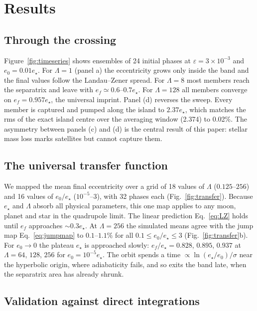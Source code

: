 \documentclass[11pt,a4paper]{article}
\newcommand{\estar}{e_\star}
\newcommand{\eps}{\varepsilon}
\begin{document}
\section{Results}\label{sec:results}

\subsection{Through the crossing}

Figure~\ref{fig:timeseries} shows ensembles of 24 initial phases at $\eps=3\times10^{-3}$ and $e_0=0.01\estar$. For $\Lambda=1$ (panel a) the eccentricity grows only inside the band and the final values follow the Landau--Zener spread. For $\Lambda=8$ most members reach the separatrix and leave with $e_f\simeq0.6$--$0.7\estar$. For $\Lambda=128$ all members converge on $e_f=0.957\estar$, the universal imprint. Panel (d) reverses the sweep. Every member is captured and pumped along the island to $2.37\estar$, which matches the rms of the exact island centre over the averaging window (2.374) to 0.02\%. The asymmetry between panels (c) and (d) is the central result of this paper: stellar mass loss marks satellites but cannot capture them.

\subsection{The universal transfer function}

We mapped the mean final eccentricity over a grid of 18 values of $\Lambda$ ($0.125$--$256$) and 16 values of $e_0/\estar$ ($10^{-5}$--$3$), with 32 phases each (Fig.~\ref{fig:transfer}). Because $\estar$ and $\Lambda$ absorb all physical parameters, this one map applies to any moon, planet and star in the quadrupole limit. The linear prediction Eq.~\eqref{eq:LZ} holds until $e_f$ approaches $\sim0.3\estar$. At $\Lambda=256$ the simulated means agree with the jump map Eq.~\eqref{eq:jumpmap} to $0.1$--$1.1\%$ for all $0.1\le e_0/\estar\le3$ (Fig.~\ref{fig:transfer}b). For $e_0\to0$ the plateau $\estar$ is approached slowly: $e_f/\estar=0.828$, $0.895$, $0.937$ at $\Lambda=64$, $128$, $256$ for $e_0=10^{-5}\estar$. The orbit spends a time $\propto\ln(\estar/e_0)/\sigma$ near the hyperbolic origin, where adiabaticity fails, and so exits the band late, when the separatrix area has already shrunk.

\subsection{Validation against direct integrations}
\end{document}
